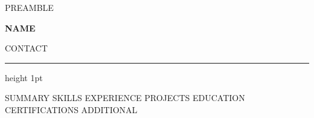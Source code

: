%
%
{{PREAMBLE}}


\renewcommand{\cvsectionfont}[1]{{\large\bfseries\color{cvaccent} #1}}
\renewcommand{\cvsectionrule}{\vspace{1.5pt}{\color{cvaccent!50}\hrule height 0.7pt}}
\renewcommand{\cvdatefont}[1]{{\small\color{cvmuted} #1}}

\renewcommand{\cvheader}[2]{%
  {\fontsize{22}{25}\selectfont\bfseries\color{cvaccent} #1}\par\vspace{3pt}%
  {\small\color{cvmuted} #2}\par\vspace{4pt}%
  {\color{cvaccent}\hrule height 1pt}%
  \vspace{2pt}%
}



\cvheader{ {{NAME}} }{ {{CONTACT}} }

{{SUMMARY}}
{{SKILLS}}
{{EXPERIENCE}}
{{PROJECTS}}
{{EDUCATION}}
{{CERTIFICATIONS}}
{{ADDITIONAL}}


